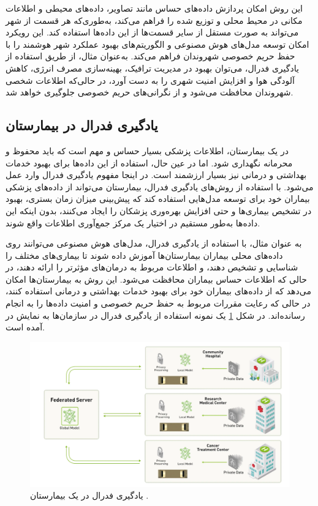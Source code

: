 این روش امکان پردازش داده‌های حساس مانند تصاویر، داده‌های محیطی و اطلاعات مکانی در محیط محلی و توزیع شده را فراهم می‌کند، به‌طوری‌که هر قسمت از شهر می‌تواند به صورت مستقل از سایر قسمت‌ها از این داده‌ها استفاده کند. این رویکرد امکان توسعه مدل‌های هوش مصنوعی و الگوریتم‌های بهبود عملکرد شهر هوشمند را با حفظ حریم خصوصی شهروندان فراهم می‌کند. به‌عنوان مثال، از طریق استفاده از یادگیری فدرال، می‌توان بهبود در مدیریت ترافیک، بهینه‌سازی مصرف انرژی، کاهش آلودگی هوا و افزایش امنیت شهری را به دست آورد، در حالی‌که اطلاعات شخصی شهروندان محافظت می‌شود و از نگرانی‌های حریم خصوصی جلوگیری خواهد شد.


\subsection{یادگیری فدرال در بیمارستان}
در یک بیمارستان، اطلاعات پزشکی بسیار حساس و مهم است که باید محفوظ و محرمانه نگهداری شود. اما در عین حال، استفاده از این داده‌ها برای بهبود خدمات بهداشتی و درمانی نیز بسیار ارزشمند است. در اینجا مفهوم یادگیری فدرال وارد عمل می‌شود. با استفاده از روش‌های یادگیری فدرال، بیمارستان می‌تواند از داده‌های پزشکی بیماران خود برای توسعه مدل‌هایی استفاده کند که پیش‌بینی میزان زمان بستری، بهبود در تشخیص بیماری‌ها و حتی افزایش بهره‌وری پزشکان را ایجاد می‌کنند، بدون اینکه این داده‌ها به‌طور مستقیم در اختیار یک مرکز جمع‌آوری اطلاعات واقع شوند.

به عنوان مثال، با استفاده از یادگیری فدرال، مدل‌های هوش مصنوعی می‌توانند روی داده‌های محلی بیماران بیمارستان‌ها آموزش داده شوند تا بیماری‌های مختلف را شناسایی و تشخیص دهند، و اطلاعات مربوط به درمان‌های مؤثرتر را ارائه دهند، در حالی که اطلاعات حساس بیماران محافظت می‌شود. این روش به بیمارستان‌ها امکان می‌دهد که از داده‌های بیماران خود برای بهبود خدمات بهداشتی و درمانی استفاده کنند، در حالی که رعایت مقررات مربوط به حفظ حریم خصوصی و امنیت داده‌ها را به انجام رسانده‌اند. در شکل
\ref{hospital}
یک نمونه استفاده از یادگیری فدرال در سازمان‌ها به نمایش در آمده است.


\begin{figure}[t]
	\centering
	\includegraphics[scale=1]{images/chap1/hospital.png}%
	\caption{%
		یادگیری فدرال در یک بیمارستان
		\cite{kim2012control}%
		.
	}
	\label{hospital}
	\centering
\end{figure}


